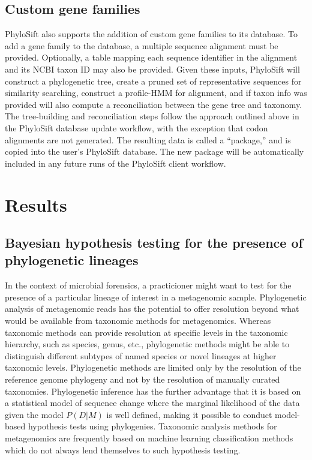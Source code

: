 \documentclass[10pt]{article}
\begin{document}
\subsection*{Custom gene families}

PhyloSift also supports the addition of custom gene families to its database.
To add a gene family to the database, a multiple sequence alignment must be provided.
Optionally, a table mapping each sequence identifier in the alignment and its NCBI taxon ID may also be provided.
Given these inputs, PhyloSift will construct a phylogenetic tree, create a pruned set of representative sequences for similarity searching, construct a profile-HMM for alignment, and if taxon info was provided will also compute a reconciliation between the gene tree and taxonomy.
The tree-building and reconciliation steps follow the approach outlined above in the PhyloSift database update workflow, with the exception that codon alignments are not generated.
The resulting data is called a ``package,'' and is copied into the user's PhyloSift database.
The new package will be automatically included in any future runs of the PhyloSift client workflow.



\section*{Results}

\subsection*{Bayesian hypothesis testing for the presence of phylogenetic lineages}
In the context of microbial forensics, a practicioner might want to test for the presence of a particular lineage of interest in a metagenomic sample.
Phylogenetic analysis of metagenomic reads has the potential to offer resolution beyond what would be available from taxonomic methods for metagenomics.
Whereas taxonomic methods can provide resolution at specific levels in the taxonomic hierarchy, such as species, genus, etc., phylogenetic methods might be able to distinguish different subtypes of named species or novel lineages at higher taxonomic levels.
Phylogenetic methods are limited only by the resolution of the reference genome phylogeny and not by the resolution of manually curated taxonomies.
Phylogenetic inference has the further advantage that it is based on a statistical model of sequence change where the marginal likelihood of the data given the model $P(D|M)$ is well defined, making it possible to conduct model-based hypothesis tests using phylogenies.
Taxonomic analysis methods for metagenomics are frequently based on machine learning classification methods which do not always lend themselves to such hypothesis testing.
\end{document}
